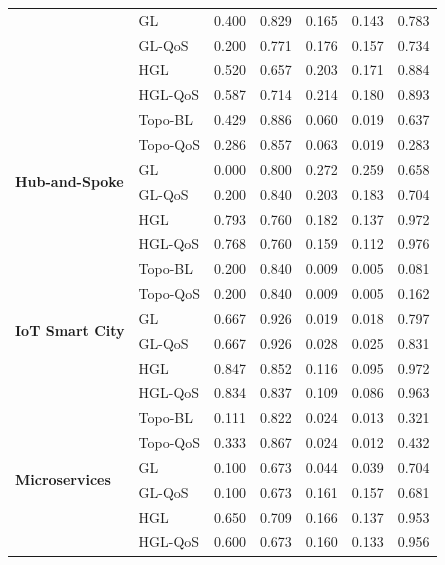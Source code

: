 \documentclass[sigconf,9pt,anonymous]{acmart}
\begin{document}
\begin{table}[t]
\begin{tabular}{l l c c c c c}
  & GL & 0.400 & 0.829 & 0.165 & 0.143 & 0.783 \\
  & GL-QoS & 0.200 & 0.771 & 0.176 & 0.157 & 0.734 \\
  & HGL & 0.520 & 0.657 & 0.203 & 0.171 & 0.884 \\
  & HGL-QoS & 0.587 & 0.714 & 0.214 & 0.180 & 0.893 \\
\midrule
\multirow{6}{*}{\textbf{Hub-and-Spoke}} 
  & Topo-BL & 0.429 & 0.886 & 0.060 & 0.019 & 0.637 \\
  & Topo-QoS & 0.286 & 0.857 & 0.063 & 0.019 & 0.283 \\
  & GL & 0.000 & 0.800 & 0.272 & 0.259 & 0.658 \\
  & GL-QoS & 0.200 & 0.840 & 0.203 & 0.183 & 0.704 \\
  & HGL & 0.793 & 0.760 & 0.182 & 0.137 & 0.972 \\
  & HGL-QoS & 0.768 & 0.760 & 0.159 & 0.112 & 0.976 \\
\midrule
\multirow{6}{*}{\textbf{IoT Smart City}} 
  & Topo-BL & 0.200 & 0.840 & 0.009 & 0.005 & 0.081 \\
  & Topo-QoS & 0.200 & 0.840 & 0.009 & 0.005 & 0.162 \\
  & GL & 0.667 & 0.926 & 0.019 & 0.018 & 0.797 \\
  & GL-QoS & 0.667 & 0.926 & 0.028 & 0.025 & 0.831 \\
  & HGL & 0.847 & 0.852 & 0.116 & 0.095 & 0.972 \\
  & HGL-QoS & 0.834 & 0.837 & 0.109 & 0.086 & 0.963 \\
\midrule
\multirow{6}{*}{\textbf{Microservices}} 
  & Topo-BL & 0.111 & 0.822 & 0.024 & 0.013 & 0.321 \\
  & Topo-QoS & 0.333 & 0.867 & 0.024 & 0.012 & 0.432 \\
  & GL & 0.100 & 0.673 & 0.044 & 0.039 & 0.704 \\
  & GL-QoS & 0.100 & 0.673 & 0.161 & 0.157 & 0.681 \\
  & HGL & 0.650 & 0.709 & 0.166 & 0.137 & 0.953 \\
  & HGL-QoS & 0.600 & 0.673 & 0.160 & 0.133 & 0.956 \\
\bottomrule
\end{tabular}
\end{table}
\end{document}
